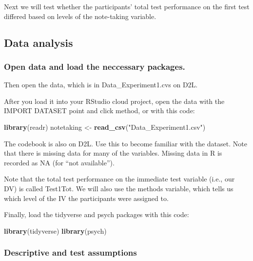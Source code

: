 \documentclass[
]{book}
\newenvironment{Shaded}{\begin{snugshade}}{\end{snugshade}}
\newcommand{\KeywordTok}[1]{\textcolor[rgb]{0.13,0.29,0.53}{\textbf{#1}}}
\newcommand{\NormalTok}[1]{#1}
\newcommand{\StringTok}[1]{\textcolor[rgb]{0.31,0.60,0.02}{#1}}
\begin{document}
Next we will test whether the participants' total test performance on the first test differed based on levels of the note-taking variable.

\hypertarget{data-analysis-2}{%
\subsection{Data analysis}\label{data-analysis-2}}

\hypertarget{open-data-and-load-the-neccessary-packages.-1}{%
\subsubsection{Open data and load the neccessary packages.}\label{open-data-and-load-the-neccessary-packages.-1}}

Then open the data, which is in Data\_Experiment1.cvs on D2L.

After you load it into your RStudio cloud project, open the data with the IMPORT DATASET point and click method, or with this code:

\begin{Shaded}
\begin{Highlighting}[]
\KeywordTok{library}\NormalTok{(readr)}
\NormalTok{notetaking <-}\StringTok{ }\KeywordTok{read_csv}\NormalTok{(}\StringTok{"Data_Experiment1.csv"}\NormalTok{)}
\end{Highlighting}
\end{Shaded}

The codebook is also on D2L. Use this to become familiar with the dataset. Note that there is missing data for many of the variables. Missing data in R is recorded as NA (for ``not available'').

Note that the total test performance on the immediate test variable (i.e., our DV) is called Test1Tot. We will also use the methods variable, which tells us which level of the IV the participants were assigned to.

Finally, load the tidyverse and psych packages with this code:

\begin{Shaded}
\begin{Highlighting}[]
\KeywordTok{library}\NormalTok{(tidyverse)}
\KeywordTok{library}\NormalTok{(psych)}
\end{Highlighting}
\end{Shaded}

\hypertarget{descriptive-and-test-assumptions}{%
\subsubsection{Descriptive and test assumptions}\label{descriptive-and-test-assumptions}}
\end{document}
